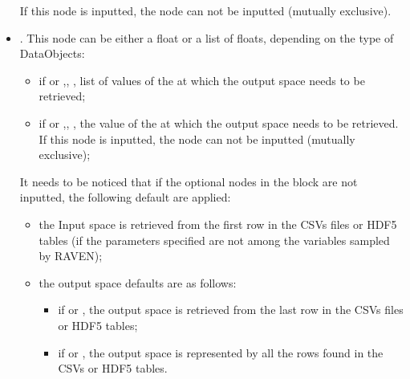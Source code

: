 \begin{itemize}
    If this node is inputted, the node   can not be inputted (mutually exclusive).
  \item {}. This node can be either a float or a list of floats, depending on the type of DataObjects:
   \begin{itemize}
      \item if  or ,, ,  list of values of the
                           at which the output space needs to be retrieved;
      \item if  or ,, ,  the value of the 
         at which the output space needs to be retrieved. If this node is inputted, the node   can not be inputted (mutually exclusive);
   \end{itemize}
  It needs to be noticed that if the optional nodes in the block  are not inputted, the following default are applied:
    \begin{itemize}
       \item the Input space is retrieved from the first row in the CSVs files or HDF5 tables (if the parameters specified are not among the variables sampled by RAVEN);
       \item  the output space defaults are as follows:
       \begin{itemize}
           \item if  or , the output space is retrieved from the last row in the CSVs files or HDF5 tables;
           \item if  or , the output space is represented by all the rows found in  the CSVs or HDF5 tables.
        \end{itemize}
    \end{itemize}
\end{itemize}

